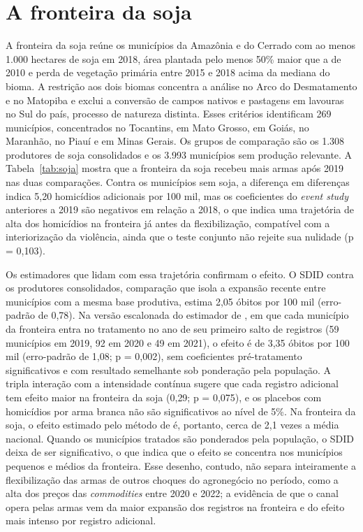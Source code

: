 \documentclass[11pt,a4paper]{article}
\begin{document}
\section{A fronteira da soja}\label{sec:soja}

A fronteira da soja reúne os municípios da Amazônia e do Cerrado com ao menos 1.000 hectares de soja em 2018, área plantada pelo menos 50\% maior que a de 2010 e perda de vegetação primária entre 2015 e 2018 acima da mediana do bioma. A restrição aos dois biomas concentra a análise no Arco do Desmatamento e no Matopiba e exclui a conversão de campos nativos e pastagens em lavouras no Sul do país, processo de natureza distinta. Esses critérios identificam 269 municípios, concentrados no Tocantins, em Mato Grosso, em Goiás, no Maranhão, no Piauí e em Minas Gerais. Os grupos de comparação são os 1.308 produtores de soja consolidados e os 3.993 municípios sem produção relevante. A Tabela~\ref{tab:soja} mostra que a fronteira da soja recebeu mais armas após 2019 nas duas comparações. Contra os municípios sem soja, a diferença em diferenças indica 5{,}20 homicídios adicionais por 100 mil, mas os coeficientes do \textit{event study} anteriores a 2019 são negativos em relação a 2018, o que indica uma trajetória de alta dos homicídios na fronteira já antes da flexibilização, compatível com a interiorização da violência, ainda que o teste conjunto não rejeite sua nulidade (p = 0{,}103).

Os estimadores que lidam com essa trajetória confirmam o efeito. O SDID contra os produtores consolidados, comparação que isola a expansão recente entre municípios com a mesma base produtiva, estima 2{,}05 óbitos por 100 mil (erro-padrão de 0{,}78). Na versão escalonada do estimador de \citet{callaway2021}, em que cada município da fronteira entra no tratamento no ano de seu primeiro salto de registros (59 municípios em 2019, 92 em 2020 e 49 em 2021), o efeito é de 3{,}35 óbitos por 100 mil (erro-padrão de 1{,}08; p = 0{,}002), sem coeficientes pré-tratamento significativos e com resultado semelhante sob ponderação pela população. A tripla interação com a intensidade contínua sugere que cada registro adicional tem efeito maior na fronteira da soja (0{,}29; p = 0{,}075), e os placebos com homicídios por arma branca não são significativos ao nível de 5\%. Na fronteira da soja, o efeito estimado pelo método de \citet{callaway2021} é, portanto, cerca de 2{,}1 vezes a média nacional. Quando os municípios tratados são ponderados pela população, o SDID deixa de ser significativo, o que indica que o efeito se concentra nos municípios pequenos e médios da fronteira. Esse desenho, contudo, não separa inteiramente a flexibilização das armas de outros choques do agronegócio no período, como a alta dos preços das \textit{commodities} entre 2020 e 2022; a evidência de que o canal opera pelas armas vem da maior expansão dos registros na fronteira e do efeito mais intenso por registro adicional.
\end{document}

